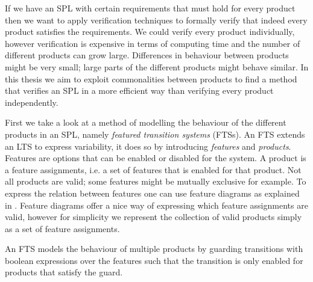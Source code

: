 If we have an SPL with certain requirements that must hold for every product then we want to apply verification techniques to formally verify that indeed every product satisfies the requirements. We could verify every product individually, however verification is expensive in terms of computing time and the number of different products can grow large. Differences in behaviour between products might be very small; large parts of the different products might behave similar. In this thesis we aim to exploit commonalities between products to find a method that verifies an SPL in a more efficient way than verifying every product independently.

First we take a look at a method of modelling the behaviour of the different products in an SPL, namely \textit{featured transition systems} (FTSs). An FTS extends an LTS to express variability, it does so by introducing \textit{features} and \textit{products}. Features are options that can be enabled or disabled for the system. A product is a feature assignments, i.e. a set of features that is enabled for that product. Not all products are valid; some features might be mutually exclusive for example. To express the relation between features one can use feature diagrams as explained in \cite{Classen2013FeaturedTS}. Feature diagrams offer a nice way of expressing which feature assignments are valid, however for simplicity we represent the collection of valid products simply as a set of feature assignments. 

An FTS models the behaviour of multiple products by guarding transitions with boolean expressions over the features such that the transition is only enabled for products that satisfy the guard.

